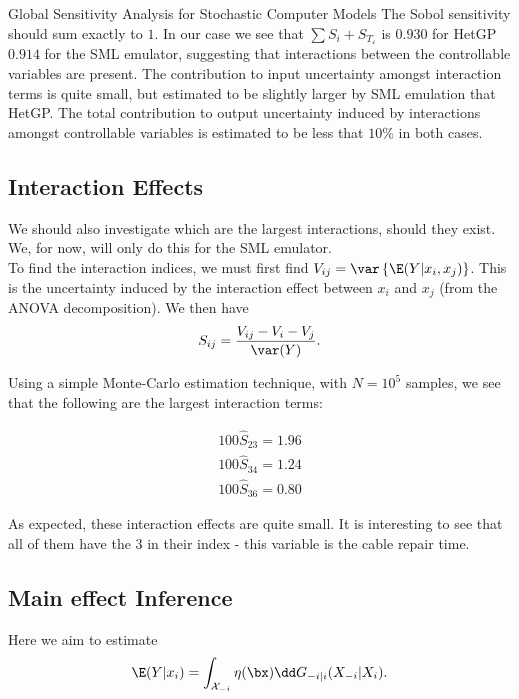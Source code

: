 \begin{chapter}{Global Sensitivity Analysis for Stochastic Computer Models}
The Sobol sensitivity should sum exactly to $1$. In our case we see that $\sum S_i + S_{T_\varepsilon}$ is $0.930$ for HetGP $0.914$ for the SML emulator, suggesting that interactions between the controllable variables are present. The contribution to input uncertainty amongst interaction terms is quite small, but estimated to be slightly larger by SML emulation that HetGP.  The total contribution to output uncertainty induced by interactions amongst controllable variables is estimated to be less that $10\%$ in both cases. 

\subsection{Interaction Effects}

We should also investigate which are the largest interactions, should they exist. We, for now, will only do this for the SML emulator.\\

To find the interaction indices, we must first find $V_{ij} = \var \left\{ \E(Y | x_i, x_j) \right\}$. This is the uncertainty induced by the interaction effect between $x_i$ and $x_j$ (from the ANOVA decomposition). We then have 
\begin{equation}
S_{ij} = \frac{V_{ij} - V_i - V_j}{\var(Y)}.
\end{equation}

Using a simple Monte-Carlo estimation technique, with $N = 10^5$ samples, we see that the following are the largest interaction terms:

\begin{align*}
	100\hat{S}_{23} = 1.96 \\
	100\hat{S}_{34} = 1.24 \\
	100\hat{S}_{36} = 0.80
\end{align*}

As expected, these interaction effects are quite small. It is interesting to see that all of them have the $3$ in their index - this variable is the cable repair time.
\subsection{Main effect Inference}

Here we aim to  estimate
\begin{equation}
	\E(Y | x_i) = \int _{\mathcal{X}_{-i}} \eta(\bx) \dd G_{-i|i}(X_{-i} | X_i).
\end{equation}


\end{chapter}
